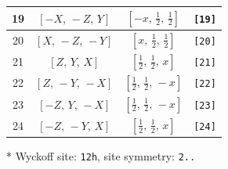 \documentclass[fleqn,8pt]{jsarticle}
\begin{document}
\begin{longtable}{cccc}
19 & $\left[ - X,\, - Z,\, Y \right]$ & $\left[ - x,\, \frac{1}{2},\, \frac{1}{2} \right]$ & {\tt [19]} \\ \hline
20 & $\left[ X,\, - Z,\, - Y \right]$ & $\left[ x,\, \frac{1}{2},\, \frac{1}{2} \right]$ & {\tt [20]} \\ \hline
21 & $\left[ Z,\, Y,\, X \right]$ & $\left[ \frac{1}{2},\, \frac{1}{2},\, x \right]$ & {\tt [21]} \\ \hline
22 & $\left[ Z,\, - Y,\, - X \right]$ & $\left[ \frac{1}{2},\, \frac{1}{2},\, - x \right]$ & {\tt [22]} \\ \hline
23 & $\left[ - Z,\, Y,\, - X \right]$ & $\left[ \frac{1}{2},\, \frac{1}{2},\, - x \right]$ & {\tt [23]} \\ \hline
24 & $\left[ - Z,\, - Y,\, X \right]$ & $\left[ \frac{1}{2},\, \frac{1}{2},\, x \right]$ & {\tt [24]} \\
\end{longtable}
* Wyckoff site: {\tt 12h}, site symmetry: {\tt 2..}
\renewcommand{\arraystretch}{1.2}
\end{document}
